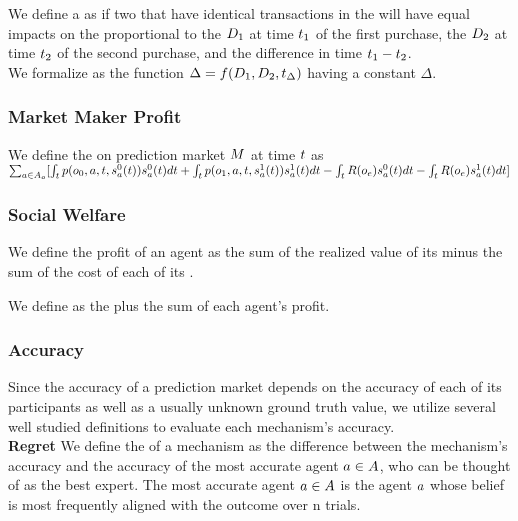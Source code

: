 We define a  as  if two  that have identical
transactions in the  will have equal impacts on the  proportional to 
the  $D_{1}$ at time $t_{1}$ of the first purchase, the  
$D_{2}$ at time $t_{2}$ of the second purchase, and the difference in time $t_{1} - t_{2}$.\\

We formalize  as the function $\Delta = f(D_{1},D_{2},t_{\Delta})$
having a constant $\Delta$.\\

\subsubsection{Market Maker Profit}
We define the  on prediction market $M$ at time $t$ as\\
$\sum_{a\in A_o} [
\int_{t} 
p(o_0,a,t, s^{0}_{a}(t))s^{0}_{a}(t)dt
+\int_{t} 
p(o_1,a,t, s^{1}_{a}(t))s^{1}_{a}(t)dt
-\int_{t} 
R(o_e)s^{0}_{a}(t)dt
-\int_{t}
R(o_e)s^{1}_{a}(t)dt]$

\subsubsection{Social Welfare}
We define the profit of an agent as the sum of the realized value of its  minus the
sum of the cost of each of its .

We define  as the  plus the sum of each agent's profit.

\subsubsection{Accuracy}
Since the accuracy of a prediction market depends on the accuracy of each of its participants
as well as a usually unknown ground truth value, we utilize several well studied definitions
to evaluate each mechanism's accuracy.\\

\textbf{Regret}
We define the  of a mechanism as the difference between the mechanism's accuracy
and the accuracy of the most accurate agent $a\in A$, who can be thought of as the
best expert. The most accurate agent $a\in A$ is the agent $a$ whose belief is
most frequently aligned with the outcome over n trials.

